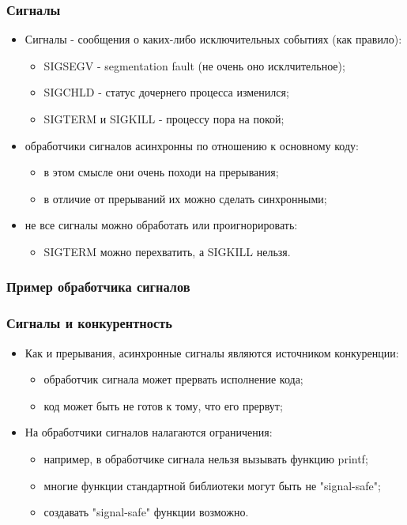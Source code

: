 \begin{frame}
\frametitle{Сигналы}

\begin{itemize}
  \item<1-> Сигналы - сообщения о каких-либо исключительных событиях (как правило):
    \begin{itemize}
      \item SIGSEGV - segmentation fault (не очень оно исклчительное);
      \item SIGCHLD - статус дочернего процесса изменился;
      \item SIGTERM и SIGKILL - процессу пора на покой;
    \end{itemize}
  \item<2-> обработчики сигналов асинхронны по отношению к основному коду:
    \begin{itemize}
      \item в этом смысле они очень походи на прерывания;
      \item в отличие от прерываний их можно сделать синхронными;
    \end{itemize}
  \item<3-> не все сигналы можно обработать или проигнорировать:
    \begin{itemize}
      \item SIGTERM можно перехватить, а SIGKILL нельзя.
    \end{itemize}
\end{itemize}
\end{frame}

\begin{frame}[fragile]
\frametitle{Пример обработчика сигналов}

\end{frame}

\begin{frame}
\frametitle{Сигналы и конкурентность}

\begin{itemize}
  \item<1-> Как и прерывания, асинхронные сигналы являются источником конкуренции:
    \begin{itemize}
      \item обработчик сигнала может прервать исполнение кода;
      \item код может быть не готов к тому, что его прервут;
    \end{itemize}
  \item<2-> На обработчики сигналов налагаются ограничения:
    \begin{itemize}
      \item например, в обработчике сигнала нельзя вызывать функцию printf;
      \item многие функции стандартной библиотеки могут быть не "signal-safe";
      \item создавать "signal-safe" функции возможно.
    \end{itemize}
\end{itemize}
\end{frame}

